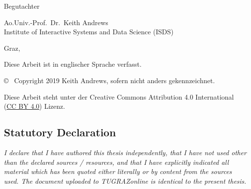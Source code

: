 \begin{otherlanguage}{austrian}
\begin{center}
        {\small\sffamily Begutachter}

        \vspace{5mm}

        {\normalsize\sffamily
            Ao.Univ.-Prof.\ Dr.\ Keith Andrews \\
            Institute of Interactive Systems and Data Science (ISDS)
        }


        \vspace{1cm}

        {\normalsize\sffamily Graz, \thisdate}


        \vspace{1cm}

        {\small Diese Arbeit ist in englischer Sprache verfasst.}



        \vfill

        {\footnotesize\sffamily \copyright ~ Copyright 2019 Keith Andrews, sofern
            nicht anders gekennzeichnet.}

        {\footnotesize\sffamily Diese Arbeit steht unter der Creative Commons
            Attribution 4.0 International
            (\href{https://creativecommons.org/licenses/by/4.0/}{CC BY 4.0})
            Lizenz.}

    \end{center}

\end{otherlanguage}







\cleardoublepage

\vspace*{2cm}







\subsection*{Statutory Declaration}
\noindent
\textit{
    I declare that I have authored this thesis independently, that I have
    not used other than the declared sources / resources, and that I have
    explicitly indicated all material which has been quoted either
    literally or by content from the sources used. The document uploaded
    to TUGRAZonline is identical to the present thesis.}

